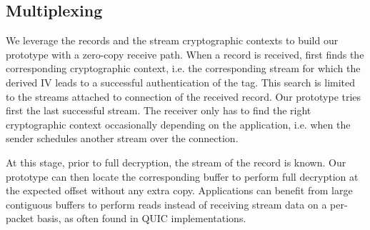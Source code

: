 \subsection{Multiplexing}
\label{sec:prot-multiplexing}

We leverage the \tcpls records and the \tcpls stream cryptographic contexts to 
build our prototype with a zero-copy receive path. When a record is received,
\tcpls first finds the corresponding cryptographic context, i.e. the
corresponding \tcpls stream for which the derived IV leads to a successful
authentication of the tag. This search is limited to the streams attached to 
\tcp connection of the received record. Our prototype tries first the last 
successful \tcpls stream. The receiver only has to find the right cryptographic 
context occasionally depending on the application, i.e. when the sender 
schedules another stream over the \tcp connection.

At this stage, prior to full decryption, the 
\tcpls stream of the record is known. Our prototype can then locate the 
corresponding buffer
to perform full decryption at the expected offset without any extra copy.
Applications can benefit from large contiguous
buffers to perform reads instead of receiving stream data on a per-packet basis,
as often found in QUIC implementations.




